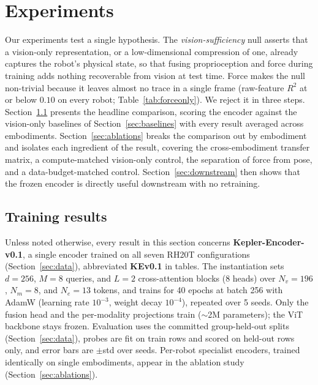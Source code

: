 \documentclass{article}
\begin{document}
\section{Experiments}
\label{sec:experiments}
Our experiments test a single hypothesis. The \emph{vision-sufficiency} null asserts that a vision-only representation, or a low-dimensional compression of one, already captures the robot's physical state, so that fusing proprioception and force during training adds nothing recoverable from vision at test time. Force makes the null non-trivial because it leaves almost no trace in a single frame (raw-feature $R^2$ at or below $0.10$ on every robot; Table~\ref{tab:forceonly}). We reject it in three steps. Section~\ref{sec:setup} presents the headline comparison, scoring the encoder against the vision-only baselines of Section~\ref{sec:baselines} with every result averaged across embodiments. Section~\ref{sec:ablations} breaks the comparison out by embodiment and isolates each ingredient of the result, covering the cross-embodiment transfer matrix, a compute-matched vision-only control, the separation of force from pose, and a data-budget-matched control. Section~\ref{sec:downstream} then shows that the frozen encoder is directly useful downstream with no retraining.

\subsection{Training results}
\label{sec:setup}
Unless noted otherwise, every result in this section concerns \textbf{Kepler-Encoder-v0.1}, a single encoder trained on all seven RH20T configurations (Section~\ref{sec:data}), abbreviated \textbf{KEv0.1} in tables. The instantiation sets $d=256$, $M=8$ queries, and $L=2$ cross-attention blocks (8 heads) over $N_v=196$, $N_m=8$, and $N_e=13$ tokens, and trains for 40 epochs at batch 256 with AdamW (learning rate $10^{-3}$, weight decay $10^{-4}$), repeated over 5 seeds. Only the fusion head and the per-modality projections train ($\sim$2M parameters); the ViT backbone stays frozen. Evaluation uses the committed group-held-out splits (Section~\ref{sec:data}), probes are fit on train rows and scored on held-out rows only, and error bars are $\pm$std over seeds. Per-robot specialist encoders, trained identically on single embodiments, appear in the ablation study (Section~\ref{sec:ablations}).
\end{document}
